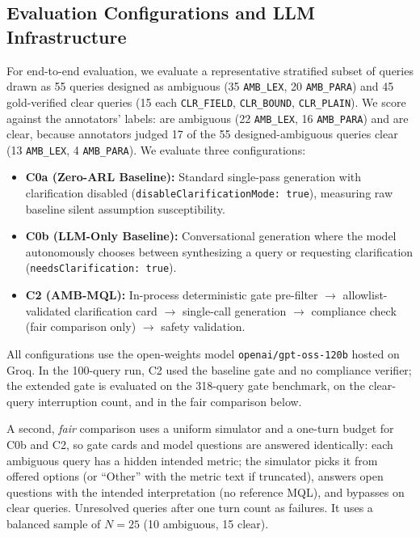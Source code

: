 \subsection{Evaluation Configurations and LLM Infrastructure}
For end-to-end evaluation, we evaluate a representative stratified subset of \eTwoETotalQueries{} queries drawn as 55 queries designed as ambiguous (35 \texttt{AMB\_LEX}, 20 \texttt{AMB\_PARA}) and 45 gold-verified clear queries (15 each \texttt{CLR\_FIELD}, \texttt{CLR\_BOUND}, \texttt{CLR\_PLAIN}). We score against the annotators' labels: \eTwoEAmbiguousQueries{} are ambiguous (22 \texttt{AMB\_LEX}, 16 \texttt{AMB\_PARA}) and \eTwoEClearQueries{} are clear, because annotators judged 17 of the 55 designed-ambiguous queries clear (13 \texttt{AMB\_LEX}, 4 \texttt{AMB\_PARA}). We evaluate three configurations:
\begin{itemize}
    \item \textbf{C0a (Zero-ARL Baseline):} Standard single-pass generation with clarification disabled (\texttt{disableClarificationMode: true}), measuring raw baseline silent assumption susceptibility.
    \item \textbf{C0b (LLM-Only Baseline):} Conversational generation where the model autonomously chooses between synthesizing a query or requesting clarification (\texttt{needsClarification: true}).
    \item \textbf{C2 (AMB-MQL):} In-process deterministic gate pre-filter $\to$ allowlist-validated clarification card $\to$ single-call generation $\to$ compliance check (fair comparison only) $\to$ safety validation.
\end{itemize}
All configurations use the open-weights model \texttt{openai/gpt-oss-120b} hosted on Groq. In the 100-query run, C2 used the baseline gate and no compliance verifier; the extended gate is evaluated on the 318-query gate benchmark, on the clear-query interruption count, and in the fair comparison below.

A second, \emph{fair} comparison uses a uniform simulator and a one-turn budget for C0b and C2, so gate cards and model questions are answered identically: each ambiguous query has a hidden intended metric; the simulator picks it from offered options (or ``Other'' with the metric text if truncated), answers open questions with the intended interpretation (no reference MQL), and bypasses on clear queries. Unresolved queries after one turn count as failures. It uses a balanced sample of $N{=}25$ (10 ambiguous, 15 clear).

